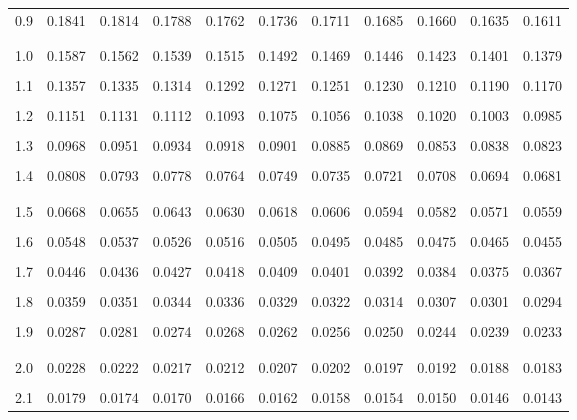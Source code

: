 \documentclass{report}
\begin{document}
\begin{center}
\begin{tabular*}{\linewidth}{@{\extracolsep{\fill}} |c|c|ccc|ccc|ccc|}
    0.9 & 0.1841 & 0.1814 & 0.1788 & 0.1762 & 0.1736 & 0.1711 & 0.1685 & 0.1660 & 0.1635 & 0.1611 \\
    \\[-1em]
    \hline
    \\[-1em]
    1.0 & 0.1587 & 0.1562 & 0.1539 & 0.1515 & 0.1492 & 0.1469 & 0.1446 & 0.1423 & 0.1401 & 0.1379 \\
    \\[-1em]
    1.1 & 0.1357 & 0.1335 & 0.1314 & 0.1292 & 0.1271 & 0.1251 & 0.1230 & 0.1210 & 0.1190 & 0.1170 \\
    \\[-1em]
    1.2 & 0.1151 & 0.1131 & 0.1112 & 0.1093 & 0.1075 & 0.1056 & 0.1038 & 0.1020 & 0.1003 & 0.0985 \\
    \\[-1em]
    1.3 & 0.0968 & 0.0951 & 0.0934 & 0.0918 & 0.0901 & 0.0885 & 0.0869 & 0.0853 & 0.0838 & 0.0823 \\
    \\[-1em]
    1.4 & 0.0808 & 0.0793 & 0.0778 & 0.0764 & 0.0749 & 0.0735 & 0.0721 & 0.0708 & 0.0694 & 0.0681 \\
    \\[-1em]
    \hline
    \\[-1em]
    1.5 & 0.0668 & 0.0655 & 0.0643 & 0.0630 & 0.0618 & 0.0606 & 0.0594 & 0.0582 & 0.0571 & 0.0559 \\
    \\[-1em]
    1.6 & 0.0548 & 0.0537 & 0.0526 & 0.0516 & 0.0505 & 0.0495 & 0.0485 & 0.0475 & 0.0465 & 0.0455 \\
    \\[-1em]
    1.7 & 0.0446 & 0.0436 & 0.0427 & 0.0418 & 0.0409 & 0.0401 & 0.0392 & 0.0384 & 0.0375 & 0.0367 \\
    \\[-1em]
    1.8 & 0.0359 & 0.0351 & 0.0344 & 0.0336 & 0.0329 & 0.0322 & 0.0314 & 0.0307 & 0.0301 & 0.0294 \\
    \\[-1em]
    1.9 & 0.0287 & 0.0281 & 0.0274 & 0.0268 & 0.0262 & 0.0256 & 0.0250 & 0.0244 & 0.0239 & 0.0233 \\
    \\[-1em]
    \hline
    \\[-1em]
    2.0 & 0.0228 & 0.0222 & 0.0217 & 0.0212 & 0.0207 & 0.0202 & 0.0197 & 0.0192 & 0.0188 & 0.0183 \\
    \\[-1em]
    2.1 & 0.0179 & 0.0174 & 0.0170 & 0.0166 & 0.0162 & 0.0158 & 0.0154 & 0.0150 & 0.0146 & 0.0143 \\

\end{tabular*}
\end{center}
\end{document}
